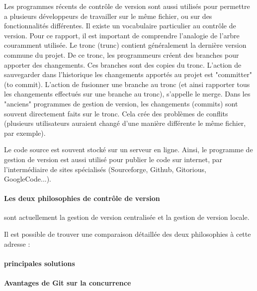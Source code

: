 Les programmes récents de contrôle de version sont aussi utilisés pour permettre a plusieurs développeurs de travailler 
sur le même fichier, ou sur des fonctionnalités différentes.
Il existe un vocabulaire particulier au contrôle de version. Pour ce rapport, il est important de comprendre l'analogie de l'arbre couramment utilisée.
Le tronc (trunc) contient généralement la dernière version commune du projet.
De ce tronc, les programmeurs créent des branches pour apporter des changements.
Ces branches sont des copies du tronc.
L'action de sauvegarder dans l'historique les changements apportés au projet est "committer" (to commit).
L'action de fusionner une branche au tronc (et ainsi rapporter tous les changements effectués sur une branche au tronc),
s'appelle le merge.
Dans les  "anciens" programmes de gestion de version, les changements (commits) sont souvent directement faits sur le tronc.
Cela crée des problèmes de conflits (plusieurs utilisateurs auraient changé d'une manière différente le même fichier, par exemple).

Le code source est souvent stocké sur un serveur en ligne. Ainsi, le programme de gestion de version est aussi utilisé
pour publier le code sur internet, par l'intermédiaire de sites spécialisés (Sourceforge, Github, Gitorious, GoogleCode...).




\paragraph{Les deux philosophies de contrôle de version} sont actuellement la gestion de version centralisée et la gestion de version locale.




Il est possible de trouver une comparaison détaillée des deux philosophies à cette adresse :



\paragraph{principales solutions}


\paragraph{Avantages de Git sur la concurrence}

